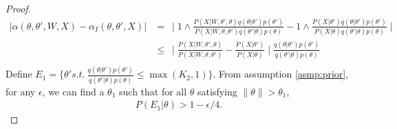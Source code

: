 \begin{proof}
\begin{align*}
|\alpha(\theta, \theta', W, X) - \alpha_I(\theta, \theta', X)| &= \ \mid 1 \wedge \frac{P(X | W, \theta' , \theta)q(\theta | \theta')p(\theta')}{P(X | W, \theta , \theta')q(\theta' | \theta)p(\theta)} - 1 \wedge \frac{P(X | \theta')q(\theta | \theta')p(\theta')}{P(X | \theta)q(\theta' | \theta)p(\theta)} \mid \\
& \leq \ \mid \frac{P(X | W, \theta' , \theta)}{P(X | W, \theta , \theta')} - \frac{P(X | \theta')}{P(X | \theta)} \mid \frac{q(\theta | \theta')p(\theta')}{q(\theta' | \theta)p(\theta)}\\
\end{align*}
Define $E_1 = \{\theta' s.t.\ \frac{q(\theta | \theta')p(\theta')}{q(\theta' | \theta)p(\theta)}\leq \max(K_2, 1)\}$.
From assumption \ref{asmp:prior}, for any $\epsilon$, we can find a
$\theta_1$  such that {for all } $\theta$ satisfying $ \| \theta \| > \theta_1$,
\begin{align*}
  P(E_1  | \theta) > 1 - \epsilon / 4.
\end{align*}


\end{proof}
